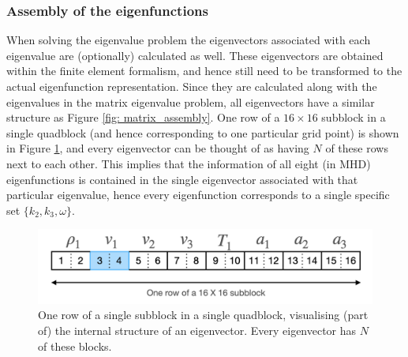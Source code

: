 \subsubsection{Assembly of the eigenfunctions}
When solving the eigenvalue problem the eigenvectors associated with each eigenvalue are (optionally) calculated as well. These eigenvectors are obtained within the finite element formalism, and hence still need to be transformed to the actual eigenfunction representation. Since they are calculated along with the eigenvalues in the matrix eigenvalue problem, all eigenvectors have a similar structure as Figure \ref{fig: matrix_assembly}. One row of a $16 \times 16$ subblock in a single quadblock (and hence corresponding to one particular grid point) is shown in Figure \ref{fig: subblock_row}, and every eigenvector can be thought of as having $N$ of these rows next to each other. This implies that the information of all eight (in MHD) eigenfunctions is contained in the single eigenvector associated with that particular eigenvalue, hence every eigenfunction corresponds to a single specific set $\{k_2, k_3, \omega\}$.

\begin{figure}[b]
  \centering
  \includegraphics[width=\textwidth]{subblock_row.png}
  \caption{
    One row of a single subblock in a single quadblock, visualising (part of) the internal structure of an eigenvector. Every eigenvector has $N$ of these blocks.
  }
  \label{fig: subblock_row}
\end{figure}


